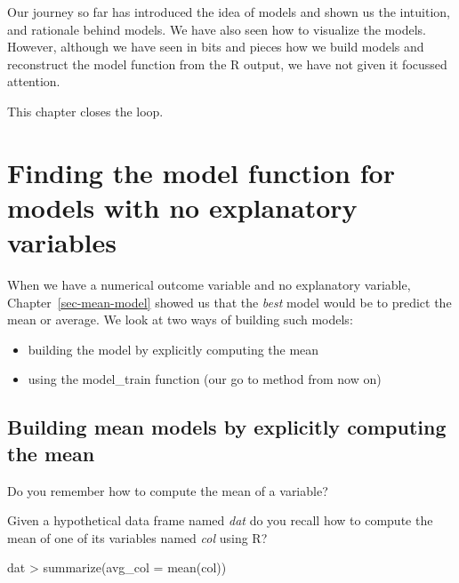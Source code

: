 \documentclass[
  12pt,
  letterpaper,
  DIV=11,
  numbers=noendperiod]{scrreprt}
\providecommand{\tightlist}{%
  \setlength{\itemsep}{0pt}\setlength{\parskip}{0pt}}
\begin{document}
Our journey so far has introduced the idea of models and shown us the
intuition, and rationale behind models. We have also seen how to
visualize the models. However, although we have seen in bits and pieces
how we build models and reconstruct the model function from the R
output, we have not given it focussed attention.

This chapter closes the loop.

\section{Finding the model function for models with no explanatory
variables}\label{finding-the-model-function-for-models-with-no-explanatory-variables}

When we have a numerical outcome variable and no explanatory variable,
Chapter~\ref{sec-mean-model} showed us that the \emph{best} model would
be to predict the mean or average. We look at two ways of building such
models:

\begin{itemize}
\tightlist
\item
  building the model by explicitly computing the mean
\item
  using the model\_train function (our go to method from now on)
\end{itemize}

\subsection{Building mean models by explicitly computing the
mean}\label{building-mean-models-by-explicitly-computing-the-mean}

Do you remember how to compute the mean of a variable?

\begin{tcolorbox}[enhanced jigsaw, colback=white, leftrule=.75mm, toprule=.15mm, bottomtitle=1mm, breakable, coltitle=black, toptitle=1mm, title={Quick Check}, opacitybacktitle=0.6, colbacktitle=quarto-callout-note-color!10!white, arc=.35mm, left=2mm, colframe=quarto-callout-note-color-frame, titlerule=0mm, rightrule=.15mm, bottomrule=.15mm, opacityback=0]

Given a hypothetical data frame named \emph{dat} do you recall how to
compute the mean of one of its variables named \emph{col} using R?

\end{tcolorbox}

\begin{tcolorbox}[enhanced jigsaw, colback=white, leftrule=.75mm, toprule=.15mm, bottomtitle=1mm, breakable, coltitle=black, toptitle=1mm, title={Suggested answer}, opacitybacktitle=0.6, colbacktitle=quarto-callout-note-color!10!white, arc=.35mm, left=2mm, colframe=quarto-callout-note-color-frame, titlerule=0mm, rightrule=.15mm, bottomrule=.15mm, opacityback=0]

dat \textbar\textgreater{} summarize(avg\_col = mean(col))

\end{tcolorbox}
\end{document}
